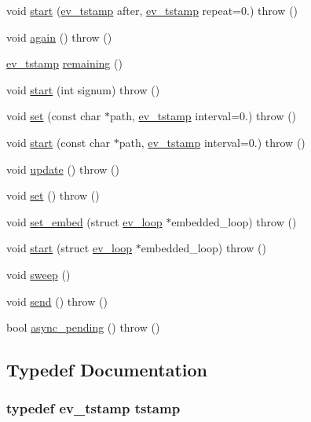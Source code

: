 \begin{DoxyCompactItemize}
\item 
void \hyperlink{namespaceev_a8c79d5364cc6a464e5e43978894e2e65}{start} (\hyperlink{ev_8h_add71e34ce2b04bbf7eb6f31a850814e8}{ev\-\_\-tstamp} after, \hyperlink{ev_8h_add71e34ce2b04bbf7eb6f31a850814e8}{ev\-\_\-tstamp} repeat=0.)  throw ()
\item 
void \hyperlink{namespaceev_ab7c9a87739679053f1cc8d9924997e88}{again} ()  throw ()
\item 
\hyperlink{ev_8h_add71e34ce2b04bbf7eb6f31a850814e8}{ev\-\_\-tstamp} \hyperlink{namespaceev_a5fd889d801efabfac0945b37392e1c80}{remaining} ()
\item 
void \hyperlink{namespaceev_adc6909ad912a1dcadd1c6057bb22abd2}{start} (int signum)  throw ()
\item 
void \hyperlink{namespaceev_ac769b7c626617c8c488674381a409ef3}{set} (const char $\ast$path, \hyperlink{ev_8h_add71e34ce2b04bbf7eb6f31a850814e8}{ev\-\_\-tstamp} interval=0.)  throw ()
\item 
void \hyperlink{namespaceev_ad301ec74ae585578be337d2cd1c4c306}{start} (const char $\ast$path, \hyperlink{ev_8h_add71e34ce2b04bbf7eb6f31a850814e8}{ev\-\_\-tstamp} interval=0.)  throw ()
\item 
void \hyperlink{namespaceev_a5bb641560ccc45a778d39c887887c354}{update} ()  throw ()
\item 
void \hyperlink{namespaceev_a62bbebcdc34a8056c32d0b1a26026717}{set} ()  throw ()
\item 
void \hyperlink{namespaceev_ad1c1e455ba2c264935c5067bd382cade}{set\-\_\-embed} (struct \hyperlink{structev__loop}{ev\-\_\-loop} $\ast$embedded\-\_\-loop)  throw ()
\item 
void \hyperlink{namespaceev_a6a90facb9d608bdabb83b7cb4416b110}{start} (struct \hyperlink{structev__loop}{ev\-\_\-loop} $\ast$embedded\-\_\-loop)  throw ()
\item 
void \hyperlink{namespaceev_adb7cfbaaf2a233e8b17711e118c8987a}{sweep} ()
\item 
void \hyperlink{namespaceev_a28510b06b8f37de1192b841d5eec8d8c}{send} ()  throw ()
\item 
bool \hyperlink{namespaceev_af6be39a41980f0e42ffb968bee09889b}{async\-\_\-pending} ()  throw ()
\end{DoxyCompactItemize}


\subsection{\-Typedef \-Documentation}
\hypertarget{namespaceev_a9853823b701944a8a5ce179d10a24b97}{
\subsubsection[{tstamp}]{\setlength{\rightskip}{0pt plus 5cm}typedef {\bf ev\-\_\-tstamp} {\bf tstamp}}}\label{namespaceev_a9853823b701944a8a5ce179d10a24b97}


